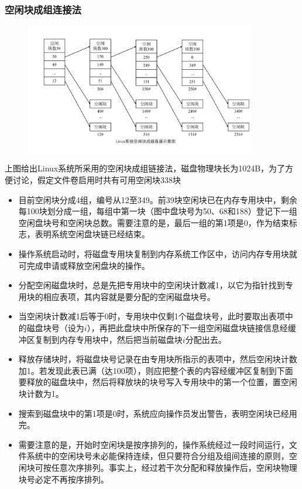\documentclass[cs4size,a4paper,10pt]{ctexart}
\begin{document}
	\subsubsection{空闲块成组连接法}

	\begin{figure}[H]
		\centering
		\includegraphics[width=0.9\textwidth]{img/5.6.1.2.1}
	\end{figure}

	上图给出Linux系统所采用的空闲块成组链接法，磁盘物理块长为1024B，为了方便讨论，假定文件卷启用时共有可用空闲块338块
	\begin{itemize}
		\item 目前空闲块分成4组，编号从12至349。前39块空闲块已在内存专用块中，剩余每100块划分成一组，每组中第一块（图中盘块号为50、68和188）登记下一组空闲盘块号和空闲块总数。需要注意的是，最后一组的第1项是0，作为结束标志，表明系统空闲盘块链已经结束。
		\item 操作系统启动时，将磁盘专用块复制到内存系统工作区中，访问内存专用块就可完成申请或释放空闲盘块的操作。
		\item 分配空闲磁盘块时，总是先把专用块中的空闲块计数减1，以它为指针找到专用块的相应表项，其内容就是要分配的空闲磁盘块号。
		\item 当空闲块计数减1后等于0时，专用块中仅剩1个磁盘块号，此时要取出表项中的磁盘块号（设为$i$），再把此盘块中所保存的下一组空闲磁盘块链接信息经缓冲区复制到内存专用块中，然后把当前磁盘块$i$分配出去。
		\item 释放存储块时，将磁盘块号记录在由专用块所指示的表项中，然后空闲块计数加1。若发现此表已满（达100项），则应把整个表的内容经缓冲区复制到下面要释放的磁盘块中，然后将释放块的块号写入专用块中的第一个位置，置空闲块计数为1。
		\item 搜索到磁盘块中的第1项是0时，系统应向操作员发出警告，表明空闲块已经用完。
		\item 需要注意的是，开始时空闲块是按序排列的，操作系统经过一段时间运行，文件系统中的空闲块号未必能保持连续，但只要符合分组及组间连接的原则，空闲块可按任意次序排列。事实上，经过若干次分配和释放操作后，空闲块物理块号必定不再按序排列。
	\end{itemize}
\end{document}
